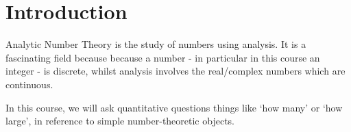 \documentclass{article}
\begin{document}
\maketitle

\tableofcontents

\clearpage
\section{Introduction}
\newlec
Analytic Number Theory is the study of numbers using analysis. It is a fascinating field because because a number - in particular in this course an integer - is discrete, whilst analysis involves the real/complex numbers which are continuous.

In this course, we will ask quantitative questions things like `how many' or `how large', in reference to simple number-theoretic objects.
\end{document}
